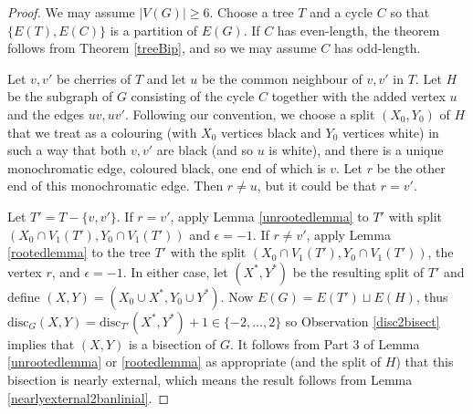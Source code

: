\documentclass[12pt]{article}
\begin{document}
\begin{proof}
We may assume $|V(G)| \ge 6$. Choose a tree $T$ and a cycle $C$ so that $\{ E(T), E(C) \}$ is a partition of $E(G)$. If $C$ has even-length, the theorem follows from Theorem \ref{treeBip}, and so we may assume $C$ has odd-length. 

Let $v,v'$ be cherries of $T$ and let $u$ be the common neighbour of $v,v'$ in $T$.  Let $H$ be the subgraph of $G$ consisting of the cycle $C$ together with the added vertex $u$ and the edges $uv, uv'$.  Following our convention, we choose a split $(X_0,Y_0)$ of $H$ that we treat as a colouring (with $X_0$ vertices black and $Y_0$ vertices white) in such a way that both $v,v'$ are black (and so $u$ is white), and there is a unique monochromatic edge, coloured black, one end of which is $v$.  Let $r$ be the other end of this monochromatic edge. Then $r \neq u$, but it could be that $r = v'$.


Let $T' = T - \{v,v'\}$. If $r = v'$, apply Lemma \ref{unrootedlemma} to $T'$ with split $(X_0 \cap V_1(T'), Y_0 \cap V_1(T'))$ and $\epsilon = -1$. If $r \neq v'$, apply Lemma \ref{rootedlemma} to the tree $T'$ with the split $(X_0 \cap V_1(T'), Y_0 \cap V_1(T'))$, the vertex $r$, and $\epsilon = -1$. 
In either case, let $(X^*,Y^*)$ be the resulting split of $T'$ and define $(X,Y) = (X_0 \cup X^*, Y_0 \cup Y^*)$.  Now $E(G) = E(T') \sqcup E(H)$, thus $\mathrm{disc}_G(X,Y) = \mathrm{disc}_{T'}(X^*,Y^*) + 1 \in \{ -2, \ldots , 2\}$ so Observation \ref{disc2bisect} implies that $(X,Y)$ is a bisection of $G$. It follows from Part 3 of Lemma \ref{unrootedlemma} or \ref{rootedlemma} as appropriate (and the split of $H$) that this bisection is nearly external, which means the result follows from Lemma \ref{nearlyexternal2banlinial}.
\end{proof}



\end{document}
